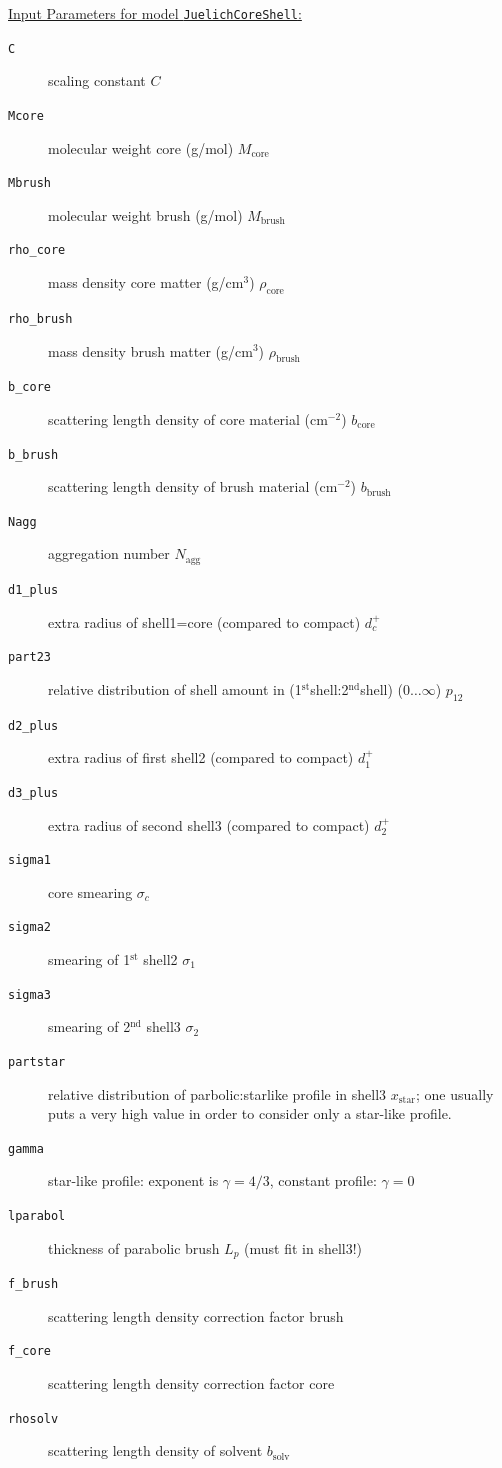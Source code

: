 \vspace{5mm}
\noindent \underline{Input Parameters for model \texttt{JuelichCoreShell}:}
\begin{description}
\item[\texttt{C}] scaling constant $C$
\item[\texttt{Mcore}] molecular weight core (g/mol) $M_\text{core}$
\item[\texttt{Mbrush}] molecular weight brush (g/mol) $M_\text{brush}$
\item[\texttt{rho\_core}] mass density core matter (g/cm$^3$) $\rho_\text{core}$
\item[\texttt{rho\_brush}] mass density brush matter (g/cm$^3$) $\rho_\text{brush}$
\item[\texttt{b\_core}] scattering length density of core material (cm$^{-2}$) $b_\text{core}$
\item[\texttt{b\_brush}] scattering length density of brush material (cm$^{-2}$) $b_\text{brush}$
\item[\texttt{Nagg}] aggregation number $N_\text{agg}$
\item[\texttt{d1\_plus}] extra radius of shell1=core (compared to compact) $d_c^+$
\item[\texttt{part23}] relative distribution of shell amount in
                (1$^\text{st}$shell:2$^\text{nd}$shell) ($0\ldots\infty$) $p_{12}$
\item[\texttt{d2\_plus}] extra radius of first shell2 (compared to compact) $d_1^+$
\item[\texttt{d3\_plus}] extra radius of second shell3 (compared to compact) $d_2^+$
\item[\texttt{sigma1}] core smearing $\sigma_c$
\item[\texttt{sigma2}] smearing of 1$^\text{st}$ shell2 $\sigma_1$
\item[\texttt{sigma3}] smearing of 2$^\text{nd}$ shell3 $\sigma_2$
\item[\texttt{partstar}] relative distribution of parbolic:starlike profile in shell3 $x_\text{star}$;
        one usually puts a very high value in order to consider only a star-like profile.
\item[\texttt{gamma}] star-like profile: exponent is $\gamma=4/3$, constant profile: $\gamma=0$
\item[\texttt{lparabol}] thickness of parabolic brush $L_p$ (must fit in shell3!)
\item[\texttt{f\_brush}] scattering length density correction factor brush
\item[\texttt{f\_core}] scattering length density correction factor core
\item[\texttt{rhosolv}] scattering length density of solvent $b_\textrm{solv}$
\end{description}

